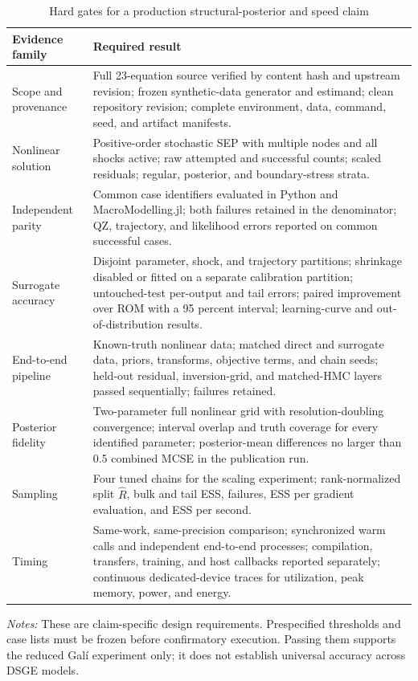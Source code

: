 \begin{table}[t]
\centering
\caption{Hard gates for a production structural-posterior and speed claim}
\label{tab:submission-gates}
\small
\begin{tabular}{p{}p{}}
\toprule
Evidence family & Required result \\
\midrule
Scope and provenance & Full 23-equation source verified by content hash and upstream revision; frozen synthetic-data generator and estimand; clean repository revision; complete environment, data, command, seed, and artifact manifests. \\
Nonlinear solution & Positive-order stochastic SEP with multiple nodes and all shocks active; raw attempted and successful counts; scaled residuals; regular, posterior, and boundary-stress strata. \\
Independent parity & Common case identifiers evaluated in Python and MacroModelling.jl; both failures retained in the denominator; QZ, trajectory, and likelihood errors reported on common successful cases. \\
Surrogate accuracy & Disjoint parameter, shock, and trajectory partitions; shrinkage disabled or fitted on a separate calibration partition; untouched-test per-output and tail errors; paired improvement over ROM with a 95 percent interval; learning-curve and out-of-distribution results. \\
End-to-end pipeline & Known-truth nonlinear data; matched direct and surrogate data, priors, transforms, objective terms, and chain seeds; held-out residual, inversion-grid, and matched-HMC layers passed sequentially; failures retained. \\
Posterior fidelity & Two-parameter full nonlinear grid with resolution-doubling convergence; interval overlap and truth coverage for every identified parameter; posterior-mean differences no larger than 0.5 combined MCSE in the publication run. \\
Sampling & Four tuned chains for the scaling experiment; rank-normalized split $\widehat R$, bulk and tail ESS, failures, ESS per gradient evaluation, and ESS per second. \\
Timing & Same-work, same-precision comparison; synchronized warm calls and independent end-to-end processes; compilation, transfers, training, and host callbacks reported separately; continuous dedicated-device traces for utilization, peak memory, power, and energy. \\
\bottomrule
\end{tabular}

\vspace{0.4em}
\parbox{0.92\textwidth}{\footnotesize\textit{Notes:} These are claim-specific design requirements. Prespecified thresholds and case lists must be frozen before confirmatory execution. Passing them supports the reduced Gal\'i experiment only; it does not establish universal accuracy across DSGE models.}
\end{table}

